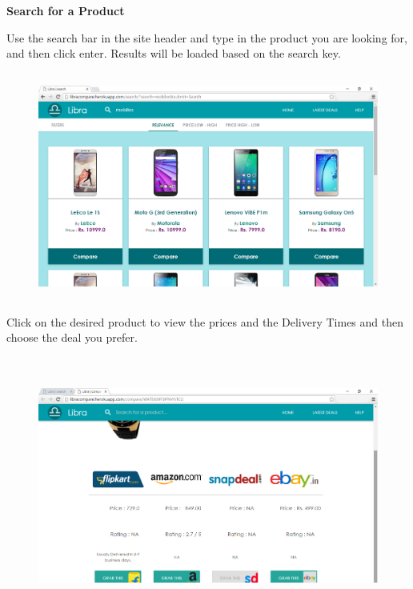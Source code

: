 \textbf{\large Search for a Product}\\
\vspace{2mm}

Use the search bar in the site header and type in the product you are looking for, and then click enter. Results will be loaded based on the search key.

\begin{figure}[h!]
\centering
\includegraphics[width=13cm, height=7.5cm]{figure/search1.png}
\end{figure}

\newpage

Click on the desired product to view the prices and the Delivery Times and then choose the deal you prefer.

\begin{figure}[h!]
\centering
\includegraphics[width=13cm, height=8.5cm]{figure/compare1.png}
\end{figure}

\vspace{2mm}

